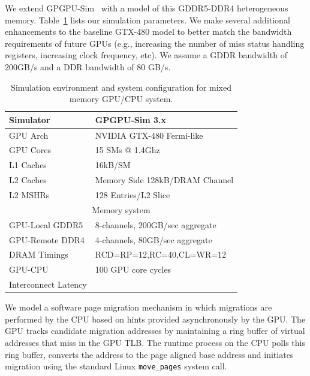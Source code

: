 We extend GPGPU-Sim~\cite{gpgpusim_ispass09} with a model of this GDDR5-DDR4 
heterogeneous memory. Table~\ref{tab:methodology} lists our simulation 
parameters. We make several additional enhancements to the baseline GTX-480 
model to better match the bandwidth requirements of future GPUs (e.g., 
increasing the number of miss status handling registers, increasing clock 
frequency, etc).  We assume a GDDR bandwidth of 200GB/s and a DDR bandwidth of 80 
GB/s.

\begin{table}[t]
\begin{center}
\begin{tabular}{|l|l|}
\hline
Simulator & GPGPU-Sim 3.x\\
\hline
GPU Arch & NVIDIA GTX-480 Fermi-like\\
\hline
GPU Cores& 15 {\color{black}SMs} @ 1.4Ghz\\
\hline
L1 Caches & 16kB/SM \\
\hline
L2 Caches & Memory Side 128kB/DRAM Channel\\
\hline
L2 MSHRs & 128 Entries/L2 Slice\\
\hline
\hline
\multicolumn{2}{|c|}{Memory system}\\
\hline
GPU-Local GDDR5 & 8-channels, 200GB/sec aggregate\\
\hline
GPU-Remote DDR4& 4-channels, 80GB/sec aggregate\\
\hline
DRAM Timings & \multicolumn{1}{|l|}{RCD=RP=12,RC=40,CL=WR=12}\\
\hline
GPU-CPU &  100 GPU core cycles\\
Interconnect Latency & \\
\hline
\end{tabular}
\caption{Simulation environment and system configuration for mixed memory GPU/CPU system.}
\label{tab:methodology}
\end{center}
\end{table}

We model a software page migration mechanism in which migrations are performed by 
the CPU based on hints provided asynchronously by the GPU\@.  The GPU tracks 
candidate migration addresses by maintaining a ring buffer of virtual addresses 
that miss in the GPU TLB.  The runtime process on the CPU polls this ring 
buffer, converts the address to the page aligned base address and initiates migration
using the standard Linux {\tt move\_pages} system call.

